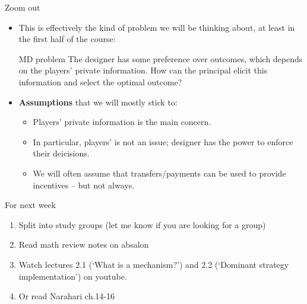 \documentclass[english,10pt
,aspectratio=169
]{beamer}
\begin{document}
\begin{frame}{Zoom out}
	\begin{itemize}
		\item This is effectively the kind of problem we will be thinking about, at least in the first half of the course:
		\begin{exampleblock}{MD problem}
			The designer has some preference over outcomes, which depends on the players' private information. How can the principal elicit this information and select the optimal outcome? 
		\end{exampleblock}
		
		\item \textbf{Assumptions} that we will mostly stick to:
		\begin{itemize}
			\item Players' \alert{private information} is the main concern.
			\item In particular, players'  is not an issue; designer has the power to enforce their deicisions.
			\item We will often assume that transfers/payments can be used to provide incentives -- but not always.
		\end{itemize}
	\end{itemize}
\end{frame}



\begin{frame}{For next week}
	\begin{enumerate}
		\item Split into study groups (let me know if you are looking for a group)
		\item Read math review notes on absalon
		\item Watch lectures 2.1 (`What is a mechanism?') and 2.2 (`Dominant strategy implementation') on youtube.
		\item Or read Narahari ch.14-16
	\end{enumerate}
\end{frame}
\end{document}

